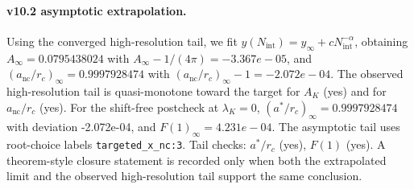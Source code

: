 \paragraph{v10.2 asymptotic extrapolation.}
Using the converged high-resolution tail, we fit $y(N_{\mathrm{int}})=y_{\infty}+cN_{\mathrm{int}}^{-\alpha}$, obtaining $A_\infty=0.0795438024$ with $A_\infty-1/(4\pi)=-3.367e-05$, and $(a_{\mathrm{nc}}/r_c)_\infty=0.9997928474$ with $(a_{\mathrm{nc}}/r_c)_\infty-1=-2.072e-04$. The observed high-resolution tail is quasi-monotone toward the target for $A_K$ (yes) and for $a_{\mathrm{nc}}/r_c$ (yes). For the shift-free postcheck at $\lambda_K=0$, $(a^*/r_c)_\infty=0.9997928474$ with deviation -2.072e-04, and $F(1)_\infty=4.231e-04$. The asymptotic tail uses root-choice labels \texttt{targeted_x_nc:3}. Tail checks: $a^*/r_c$ (yes), $F(1)$ (yes). A theorem-style closure statement is recorded only when both the extrapolated limit and the
observed high-resolution tail support the same conclusion.

